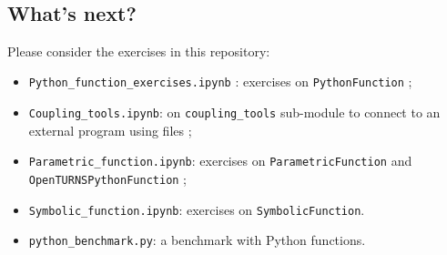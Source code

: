 \documentclass[11pt]{article}
\providecommand{\tightlist}{%
      \setlength{\itemsep}{0pt}\setlength{\parskip}{0pt}}
\begin{document}
    \begin{center}
    \end{center}
    { \hspace*{\fill} \\}
    
    \hypertarget{whats-next}{%
\subsection{What's next?}\label{whats-next}}

Please consider the exercises in this repository:

\begin{itemize}
\tightlist
\item
  \texttt{Python\_function\_exercises.ipynb} : exercises on
  \texttt{PythonFunction} ;
\item
  \texttt{Coupling\_tools.ipynb}: on \texttt{coupling\_tools} sub-module
  to connect to an external program using files ;
\item
  \texttt{Parametric\_function.ipynb}: exercises on
  \texttt{ParametricFunction} and \texttt{OpenTURNSPythonFunction} ;
\item
  \texttt{Symbolic\_function.ipynb}: exercises on
  \texttt{SymbolicFunction}.
\item
  \texttt{python\_benchmark.py}: a benchmark with Python functions.
\end{itemize}



    
    
    
\end{document}
